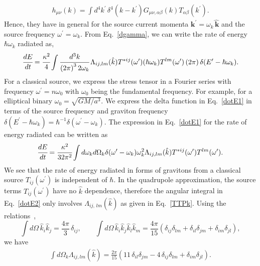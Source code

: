 \documentclass[aps,prd]{revtex4-2}
\begin{document}
\begin{eqnarray}
    h_{\mu \nu}(k) = \int d^4 k^\prime\, \delta^{4} (k-k^\prime) G_{\mu\nu, \alpha \beta}(k) T_{\alpha \beta}(k^\prime).
\end{eqnarray}
Hence, they have in general for the source current momenta $\mathbf{k}^\prime=\omega_{k} \hat{\,\mathbf k}$ and the source frequency $\omega^\prime=\omega_k$. From Eq.~\eqref{dgamma}, we can write the rate of energy $\hbar\omega_k$ radiated as,
\begin{eqnarray}\label{dotE1}
    \cfrac{dE}{dt} = \cfrac{\kappa^2}{4} \int \cfrac{d^3 k}{\left(2\pi\right)^3 2\omega_{k}}\,{\Lambda}_{ij, lm} (\hat{k})T^{*ij} ({\omega}^\prime) (\hbar \omega_{k}) T^{lm}({\omega}^\prime) \left(2\pi\right) \delta(E^{\prime} - \hbar \omega_{k}).
\end{eqnarray}
For a classical source, we express the stress tensor in a Fourier series with frequency $\omega^{\prime} = n\omega_{0}$ with $\omega_{0}$ being the fundamental frequency. For example, for a elliptical binary $\omega_{0} = \sqrt{G M / a^3}$. We express the delta function in Eq.~\eqref{dotE1} in terms of the source frequency and graviton frequency $\delta(E^\prime-\hbar\omega_{k})=\hbar^{-1} \delta(\omega^\prime- \omega_{k}) $. The expression in Eq.~\eqref{dotE1} for the rate of energy radiated can be written as
\begin{eqnarray}\label{dotE2}
\cfrac{dE}{dt} 
    = \cfrac{\kappa^2}{32 \pi^2}\int d\omega_{k}d\Omega_{k} \delta( \omega^\prime- \omega_k) \omega^{2}_{k} {\Lambda_{ij,lm}(\hat k)}T^{*ij}(\omega^{\prime})T^{lm}(\omega^{\prime}).  
\end{eqnarray}
We see that the rate of energy radiated in forms of gravitons from a classical source $T_{ij}(\omega^\prime)$ is independent of $\hbar$. In the quadrupole approximation, the source terms $T_{ij}(\omega^\prime)$ have no $\hat{k}$ dependence, therefore the angular integral in Eq.~\eqref{dotE2} only involves ${\Lambda_{ij,\,lm}(\hat k)}$ as given in Eq.~\eqref{TTPk}. Using the relations~\cite{Weinberg:1972kfs,Maggiore:2007ulw}, 
\begin{equation}
\int d\Omega\, \hat{k}_{i}\hat{k}_{j}=\frac{4\pi}{3}\,\delta_{ij}, \qquad \int d\Omega \, \hat{k}_{i}\hat{k}_{j}\hat{k}_{l}\hat{k}_{m}=\frac{4\pi}{15}(\delta_{ij} \delta_{lm}+\delta_{il} \delta_{jm}+\delta_{im} \delta_{jl}),
\label{dOmegak1}
\end{equation}
we have 
\begin{eqnarray}
    \int d\Omega_k  {\Lambda_{ij, lm}(\hat k)}= \frac{2\pi}{15} \left( 11\, \delta_{il} \delta_{jm}- 4\, \delta_{ij} \delta_{lm} + \delta_{im} \delta_{jl} \right).
\end{eqnarray}
\end{document}
